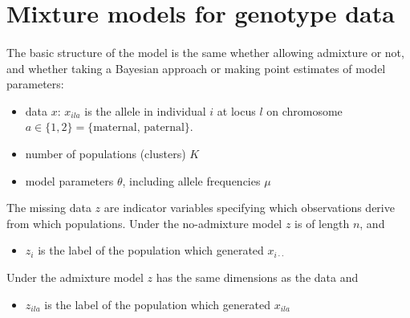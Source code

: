 \documentclass[12pt,a4paper,reqno]{article}
\newcommand{\(}{\left(}
\newcommand{\)}{\right)}
\newcommand{\|}{\arrowvert}
\begin{document}
\section*{Mixture models for genotype data}

\paragraph{}
The basic structure of the model is the same whether allowing admixture or not, and whether taking a Bayesian approach or making point estimates of model parameters:
\begin{itemize}
\item data $x$: $x_{ila}$ is the allele in individual $i$ at locus $l$ on chromosome $a \in \{1,2\} = {\{\text{maternal, paternal}\}}$. 
\item number of populations (clusters) $K$
\item model parameters $\theta$, including allele frequencies $\mu$
\end{itemize}
The missing data $z$ are indicator variables specifying which observations derive from which populations.
Under the no-admixture model $z$ is of length $n$, and 
\begin{itemize}
\item $z_{i}$ is the label of the population which generated $x_{i\cdot\cdot}$
\end{itemize}
Under the admixture model $z$ has the same dimensions as the data and
\begin{itemize}
\item $z_{ila}$ is the label of the population which generated $x_{ila}$
\end{itemize}

\end{document}
